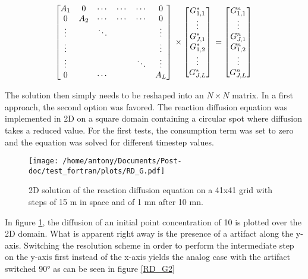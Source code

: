 \documentclass[11pt,a4paper]{article}
\begin{document}
    \[ \begin{bmatrix}
         A_{1} & 0 & \cdots & \cdots & \cdots  & 0\\
         0 & A_{2} & \cdots & \cdots & \cdots & 0 \\
         \vdots &  & \ddots & & &\vdots \\
         \vdots &  &  &  & &  \vdots  \\
         \vdots &  &  & &  \ddots & \vdots \\ 
          0 &   & \cdots &  & & A_{L} \\ 

     \end{bmatrix}
\\     
\times
     \begin{bmatrix}
         G^{*}_{1,1} \\ 
         \vdots \\ 
         G^{*}_{J,1} \\
         G^{*}_{1,2} \\
         \vdots \\
         G^{*}_{J,L} \\
     \end{bmatrix} 
     \\
     = 
       \begin{bmatrix}
         G^{n}_{1,1} \\ 
         \vdots \\ 
         G^{n}_{J,1} \\
         G^{n}_{1,2} \\
         \vdots \\
         G^{n}_{J,L} \\
     \end{bmatrix} 
     \\   
     \]

 The solution then simply needs to be reshaped into an $N \times N$  matrix. In a first approach, the second option was favored. The reaction diffusion equation was implemented in 2D on a square domain containing a circular spot where diffusion takes a reduced value. For the first tests, the consumption term was set to zero and the equation was solved for different timestep values.

\begin{figure}[ht!]
	\centering
	\texttt{[image: /home/antony/Documents/Post-doc/test\_fortran/plots/RD\_G.pdf]}
	\caption{2D solution of the reaction diffusion equation on a 41x41 grid with steps of 15 \textmu m in space and of 1 mn after 10 mn.\label{RD_G}}
\end{figure}
In figure \ref{RD_G}, the diffusion of an initial point concentration of 10 is plotted over the 2D domain. What is apparent right away is the presence of a artifact along the y-axis. Switching the resolution scheme in order to perform the intermediate step on the y-axis first instead of the x-axis yields the analog case with the artifact switched 90° as can be seen in figure \ref{RD_G2}
\end{document}

